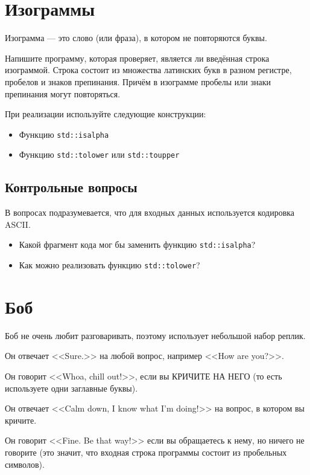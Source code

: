 \documentclass[10pt,twoside,openany]{book}
\begin{document}
\section{Изограммы}

Изограмма --- это слово (или фраза), в котором не повторяются буквы.

Напишите программу, которая проверяет, является ли введённая строка изограммой.
Строка состоит из множества латинских букв в разном регистре, пробелов и знаков препинания.
Причём в изограмме пробелы или знаки препинания могут повторяться.

При реализации используйте следующие конструкции:
\begin{itemize}
    \item Функцию {\tt std::isalpha}
    \item Функцию {\tt std::tolower} или {\tt std::toupper}
\end{itemize}

\subsection*{Контрольные вопросы}

В вопросах подразумевается, что для входных данных используется кодировка ASCII.

\begin{itemize}
    \item Какой фрагмент кода мог бы заменить функцию {\tt std::isalpha}?
    \item Как можно реализовать функцию {\tt std::tolower}?
\end{itemize}

\section{Боб}

Боб не очень любит разговаривать, поэтому использует небольшой набор реплик.

Он отвечает <<Sure.>> на любой вопрос, например <<How are you?>>.

Он говорит <<Whoa, chill out!>>, если вы КРИЧИТЕ НА НЕГО (то есть используете одни заглавные буквы).

Он отвечает <<Calm down, I know what I'm doing!>> на вопрос, в котором вы кричите.

Он говорит <<Fine. Be that way!>> если вы обращаетесь к нему, но ничего
не говорите (это значит, что входная строка программы состоит из пробельных символов).
\end{document}
